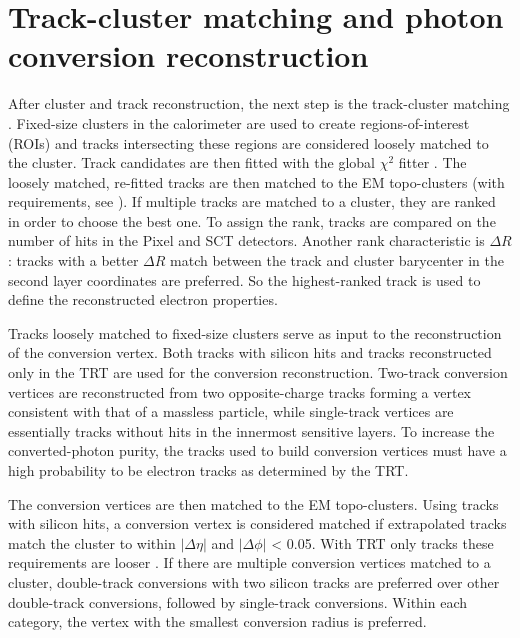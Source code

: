 \documentclass[a4paper, oneside, 11pt, openright]{book}
\begin{document}
		\section{Track-cluster matching and photon conversion reconstruction}\label{section:match}
			After cluster and track reconstruction, the next step is the track-cluster matching \cite{El ph reco}. Fixed-size clusters in the calorimeter are used to create regions-of-interest (ROIs) and tracks intersecting
			these regions are considered loosely matched to the cluster. Track candidates are then fitted with the global $\chi^2$ fitter \cite{Chiquadro}. The loosely matched, re-fitted tracks are then matched to the EM topo-clusters (with requirements, see \cite{El ph reco}).
			If multiple tracks are matched to a cluster, they are ranked in order to choose the best one. To assign the rank, tracks are compared on the number of hits in the Pixel and SCT detectors. Another rank characteristic is $\Delta R$: tracks with a better $\Delta R$ match between the track and cluster barycenter in the second layer coordinates are preferred. So the highest-ranked track is used to define the reconstructed electron properties.
			
			Tracks loosely matched to fixed-size clusters serve as input to the reconstruction of the conversion vertex. Both tracks with silicon hits and tracks reconstructed only in the TRT are used for the conversion reconstruction. Two-track conversion vertices are reconstructed from two opposite-charge tracks forming a vertex consistent with that of a massless particle, while single-track vertices are essentially tracks without hits in the innermost sensitive layers. To increase the converted-photon purity, the tracks used to build conversion vertices must have a high probability to be electron tracks as determined by the TRT. %
			
			The conversion vertices are then matched to the EM topo-clusters. Using tracks with silicon hits, a conversion vertex is considered matched if extrapolated tracks
			match the cluster to within $|\Delta \eta|$ and $|\Delta \phi|$ < 0.05. With TRT only tracks these requirements are looser \cite{TRT loose}. If there are multiple conversion vertices matched to a cluster, double-track conversions with two silicon tracks are preferred over other double-track conversions, followed by single-track conversions. Within each category, the vertex with the smallest conversion radius is preferred.
			
\end{document}
